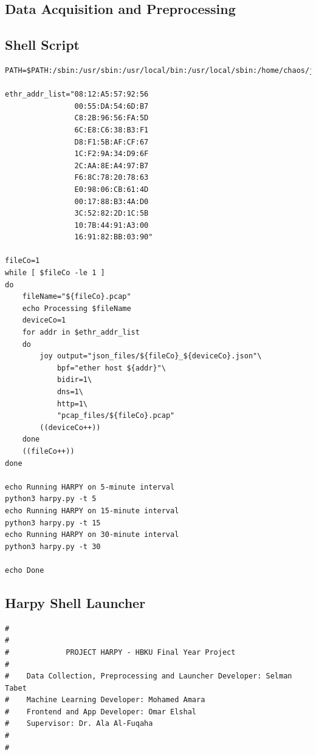 \documentclass{article}
\begin{document}
\begin{appendices}

\section{Data Acquisition and Preprocessing}
\subsection{Shell Script}
\begin{verbatim}
PATH=$PATH:/sbin:/usr/sbin:/usr/local/bin:/usr/local/sbin:/home/chaos/joy/bin

ethr_addr_list="08:12:A5:57:92:56
                00:55:DA:54:6D:B7
                C8:2B:96:56:FA:5D
                6C:E8:C6:38:B3:F1
                D8:F1:5B:AF:CF:67
                1C:F2:9A:34:D9:6F
                2C:AA:8E:A4:97:B7
                F6:8C:78:20:78:63
                E0:98:06:CB:61:4D
                00:17:88:B3:4A:D0
                3C:52:82:2D:1C:5B
                10:7B:44:91:A3:00
                16:91:82:BB:03:90"

fileCo=1
while [ $fileCo -le 1 ]
do
    fileName="${fileCo}.pcap"
    echo Processing $fileName
    deviceCo=1
    for addr in $ethr_addr_list
    do
        joy output="json_files/${fileCo}_${deviceCo}.json"\
            bpf="ether host ${addr}"\
            bidir=1\
            dns=1\
            http=1\
            "pcap_files/${fileCo}.pcap"
        ((deviceCo++))
    done
    ((fileCo++))
done

echo Running HARPY on 5-minute interval
python3 harpy.py -t 5
echo Running HARPY on 15-minute interval
python3 harpy.py -t 15
echo Running HARPY on 30-minute interval
python3 harpy.py -t 30

echo Done
\end{verbatim}

\subsection{Harpy Shell Launcher}
\begin{verbatim}
#          
#
#             PROJECT HARPY - HBKU Final Year Project
#
#    Data Collection, Preprocessing and Launcher Developer: Selman Tabet
#    Machine Learning Developer: Mohamed Amara
#    Frontend and App Developer: Omar Elshal
#    Supervisor: Dr. Ala Al-Fuqaha
#
#


\end{verbatim}
\end{appendices}
\end{document}
